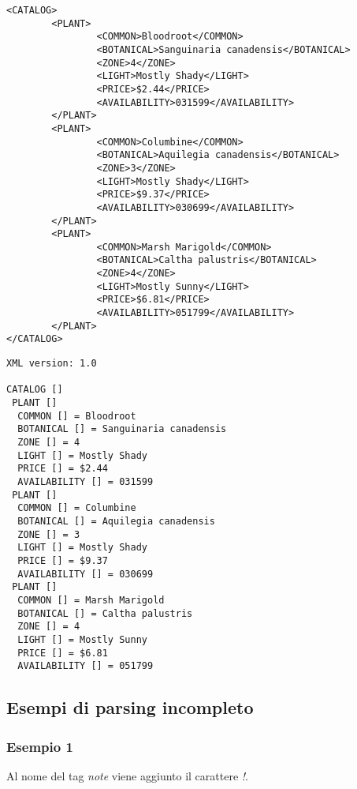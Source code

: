 \documentclass[italian,a4paper]{article}
\begin{document}
\begin{mdframed}[frametitle=Input]
\begin{verbatim}
<CATALOG>
        <PLANT>
                <COMMON>Bloodroot</COMMON>
                <BOTANICAL>Sanguinaria canadensis</BOTANICAL>
                <ZONE>4</ZONE>
                <LIGHT>Mostly Shady</LIGHT>
                <PRICE>$2.44</PRICE>
                <AVAILABILITY>031599</AVAILABILITY>
        </PLANT>
        <PLANT>
                <COMMON>Columbine</COMMON>
                <BOTANICAL>Aquilegia canadensis</BOTANICAL>
                <ZONE>3</ZONE>
                <LIGHT>Mostly Shady</LIGHT>
                <PRICE>$9.37</PRICE>
                <AVAILABILITY>030699</AVAILABILITY>
        </PLANT>
        <PLANT>
                <COMMON>Marsh Marigold</COMMON>
                <BOTANICAL>Caltha palustris</BOTANICAL>
                <ZONE>4</ZONE>
                <LIGHT>Mostly Sunny</LIGHT>
                <PRICE>$6.81</PRICE>
                <AVAILABILITY>051799</AVAILABILITY>
        </PLANT>
</CATALOG>
\end{verbatim}
\end{mdframed}

\begin{mdframed}[frametitle=Output]
\begin{verbatim}
XML version: 1.0

CATALOG []
 PLANT []
  COMMON [] = Bloodroot
  BOTANICAL [] = Sanguinaria canadensis
  ZONE [] = 4
  LIGHT [] = Mostly Shady
  PRICE [] = $2.44
  AVAILABILITY [] = 031599
 PLANT []
  COMMON [] = Columbine
  BOTANICAL [] = Aquilegia canadensis
  ZONE [] = 3
  LIGHT [] = Mostly Shady
  PRICE [] = $9.37
  AVAILABILITY [] = 030699
 PLANT []
  COMMON [] = Marsh Marigold
  BOTANICAL [] = Caltha palustris
  ZONE [] = 4
  LIGHT [] = Mostly Sunny
  PRICE [] = $6.81
  AVAILABILITY [] = 051799
\end{verbatim}
\end{mdframed}

\subsection{Esempi di parsing incompleto}

\subsubsection{Esempio 1}

Al nome del tag \emph{note} viene aggiunto il carattere \emph{!}.
\end{document}
